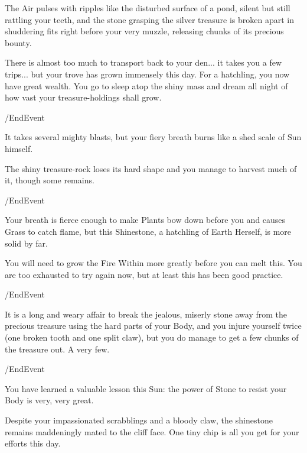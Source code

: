 The Air pulses with ripples like the disturbed surface of a pond, silent but
still rattling your teeth, and the stone grasping the silver treasure is broken
apart in shuddering fits right before your very muzzle, releasing chunks of its
precious bounty.

There is almost too much to transport back to your den... it takes you a few
trips... but your trove has grown immensely this day. For a hatchling, you now
have great wealth. You go to sleep atop the shiny mass and dream all night of
how vast your treasure-holdings shall grow.

\option /EndEvent
	  
	 



It takes several mighty blasts, but your fiery breath burns like a shed scale
of Sun himself.

The shiny treasure-rock loses its hard shape and you manage to harvest much of
it, though some remains.

\option /EndEvent 


Your breath is fierce enough to make Plants bow down before you and causes Grass
to catch flame, but this Shinestone, a hatchling of Earth Herself, is more solid
by far.

You will need to grow the Fire Within more greatly before you can melt this. You
are too exhausted to try again now, but at least this has been good practice.

\option /EndEvent 



It is a long and weary affair to break the jealous, miserly stone away from the
precious treasure using the hard parts of your Body, and you injure yourself
twice (one broken tooth and one split claw), but you do manage to get a few
chunks of the treasure out. A very few.

\option /EndEvent 


You have learned a valuable lesson this Sun: the power of Stone to resist your
Body is very, very great.

Despite your impassionated scrabblings and a bloody claw, the shinestone
remains maddeningly mated to the cliff face. One tiny chip is all you get for
your efforts this day.

